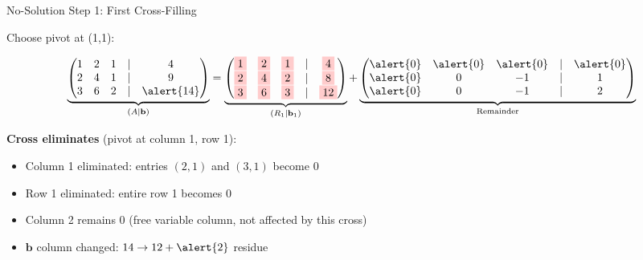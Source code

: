 \documentclass[10pt]{beamer}
\theoremstyle{definition}
\newcommand{\x}[1]{\alert{\textbf{#1}}}
\begin{document}
\begin{frame}[fragile]{No-Solution Step 1: First Cross-Filling}

Choose pivot at (1,1):

$$\underbrace{\begin{pmatrix}
1 & 2 & 1 & | & 4 \\
2 & 4 & 1 & | & 9 \\
3 & 6 & 2 & | & \alert{14}
\end{pmatrix}}_{(A \mid \mathbf{b})} = \underbrace{\begin{pmatrix}
\colorbox{red!20}{1} & \colorbox{red!20}{2} & \colorbox{red!20}{1} & | & \colorbox{red!20}{4} \\
\colorbox{red!20}{2} & \colorbox{red!20}{4} & \colorbox{red!20}{2} & | & \colorbox{red!20}{8} \\
\colorbox{red!20}{3} & \colorbox{red!20}{6} & \colorbox{red!20}{3} & | & \colorbox{red!20}{12}
\end{pmatrix}}_{(R_1 \mid \mathbf{b}_1)} + \underbrace{\begin{pmatrix}
\alert{0} & \alert{0} & \alert{0} & | & \alert{0} \\
\alert{0} & 0 & -1 & | & 1 \\
\alert{0} & 0 & -1 & | & 2
\end{pmatrix}}_{\text{Remainder}}$$

\vspace{0.5em}

\x{Cross eliminates} (pivot at column 1, row 1):
\begin{itemize}
\item \alert{Column 1} eliminated: entries $(2,1)$ and $(3,1)$ become 0
\item \alert{Row 1} eliminated: entire row 1 becomes 0
\item Column 2 remains 0 (free variable column, not affected by this cross)
\item \alert{$\mathbf{b}$ column changed}: $14 \to 12 + \alert{2}$ residue
\end{itemize}

\end{frame}
\end{document}
